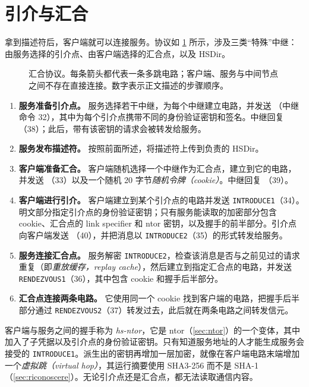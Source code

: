 \section{引介与汇合}\label{sec:os-rendezvous}

拿到描述符后，客户端就可以连接服务。协议如 \cref{fig:os-rendezvous} 所示，涉及三类“特殊”中继：由服务选择的引介点、由客户端选择的汇合点，以及 HSDir。

\begin{figure}[htbp]
\centering

\caption{汇合协议。每条箭头都代表一条多跳电路；客户端、服务与中间节点之间不存在直接连接。数字表示正文描述的步骤顺序。}
\label{fig:os-rendezvous}
\end{figure}

\begin{enumerate}
  \item \textbf{服务准备引介点。} 服务选择若干中继，为每个中继建立电路，并发送 （中继命令 32），其中为每个引介点携带不同的身份验证密钥和签名。中继回复 （38）；此后，带有该密钥的请求会被转发给服务。
  \item \textbf{服务发布描述符。} 按照前面所述，将描述符上传到负责的 HSDir。
  \item \textbf{客户端准备汇合。} 客户端随机选择一个中继作为汇合点，建立到它的电路，并发送 （33）以及一个随机 20 字节\emph{随机令牌（cookie）}。中继回复 （39）。
  \item \textbf{客户端进行引介。} 客户端建立到某个引介点的电路并发送 \texttt{INTRODUCE1}（34）。明文部分指定引介点的身份验证密钥；只有服务能读取的加密部分包含 cookie、汇合点的 link specifier 和 ntor 密钥，以及握手的前半部分。引介点向客户端发送 （40），并把消息以 \texttt{INTRODUCE2}（35）的形式转发给服务。
  \item \textbf{服务连接汇合点。} 服务解密 \texttt{INTRODUCE2}，检查该消息是否与之前见过的请求重复（即\emph{重放缓存，replay cache}），然后建立到指定汇合点的电路，并发送 \texttt{RENDEZVOUS1}（36），其中包含 cookie 和握手后半部分。
  \item \textbf{汇合点连接两条电路。} 它使用同一个 cookie 找到客户端的电路，把握手后半部分通过 \texttt{RENDEZVOUS2}（37）转发过去，此后就在两条电路之间转发信元。
\end{enumerate}

客户端与服务之间的握手称为 \emph{hs-ntor}，它是 ntor（\cref{sec:ntor}）的一个变体，其中加入了子凭据以及引介点的身份验证密钥。只有知道服务地址的人才能生成服务会接受的 \texttt{INTRODUCE1}。派生出的密钥再增加一层加密，就像在客户端电路末端增加一个\emph{虚拟跳（virtual hop）}，其运行摘要使用 SHA3-256 而不是 SHA-1（\cref{sec:riconoscere}）。无论引介点还是汇合点，都无法读取通信内容。

